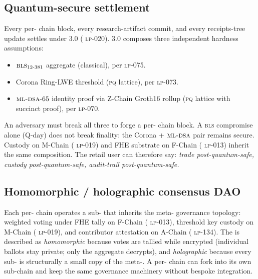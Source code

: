 \subsection{Quantum-secure settlement}
\label{sec:pq-settlement}

Every per-\LLM{} chain block, every research-artifact commit, and
every receipts-tree update settles under \Quasar{} 3.0
(\Lux{} \textsc{lp-020}). \Quasar{} 3.0 composes three independent
hardness assumptions:

\newcommand{\BLS}{\textsc{bls}}
\newcommand{\MLDSA}{\textsc{ml-dsa}}

\begin{itemize}[nosep,leftmargin=1.2em]
\item $\BLS{}_{12\text{-}381}$ aggregate (classical), per
   \Lux{} \textsc{lp-075}.
\item Corona Ring-LWE threshold (\textsc{pq} lattice), per
   \Lux{} \textsc{lp-073}.
\item $\MLDSA{}\text{-}65$ identity proof via Z-Chain Groth16 rollup
   (\textsc{pq} lattice with succinct proof), per \Lux{} \textsc{lp-070}.
\end{itemize}

An adversary must break all three to forge a per-\LLM{} chain block.
A \BLS{} compromise alone (Q-day) does not break finality: the
Corona + $\MLDSA{}$ pair remains secure. Custody on M-Chain
(\Lux{} \textsc{lp-019}) and FHE substrate on F-Chain
(\Lux{} \textsc{lp-013}) inherit the same composition. The retail
user can therefore say: \emph{trade post-quantum-safe, custody
post-quantum-safe, audit-trail post-quantum-safe.}

\subsection{Homomorphic / holographic consensus DAO}
\label{sec:dao-perllm}

Each per-\LLM{} chain operates a sub-\DAO{} that inherits the
meta-\DAO{} governance topology: weighted voting under FHE tally on
F-Chain (\Lux{} \textsc{lp-013}), threshold key custody on M-Chain
(\Lux{} \textsc{lp-019}), and contributor attestation on A-Chain
(\Lux{} \textsc{lp-134}). The \DAO{} is described as
\emph{homomorphic} because votes are tallied while encrypted
(individual ballots stay private; only the aggregate decrypts), and
\emph{holographic} because every sub-\DAO{} is structurally a small
copy of the meta-\DAO{}. A per-\LLM{} chain can fork into its own
sub-chain and keep the same governance machinery without bespoke
integration.

